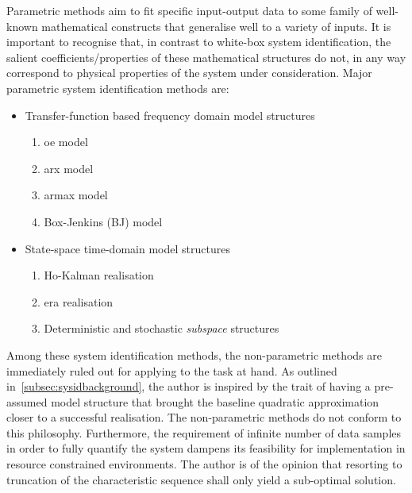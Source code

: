 Parametric  methods  aim  to  fit  specific input-output  data  to  some  family
of  well-known  mathematical  constructs  that  generalise  well  to  a  variety
of  inputs.  It  is  important  to recognise  that,  in  contrast  to  white-box
system identification, the salient coefficients/properties of these mathematical
structures do  not, in any way  correspond to physical properties  of the system
under consideration. Major parametric system identification methods are:
\begin{itemize}
    \item Transfer-function based frequency domain model structures
        \begin{enumerate}
            \item \gls{oe} model
            \item \gls{arx} model
            \item \gls{armax} model
            \item Box-Jenkins (BJ) model
        \end{enumerate}
    \item State-space time-domain model structures
        \begin{enumerate}
            \item Ho-Kalman realisation
            \item \gls{era} realisation
            \item Deterministic and stochastic \emph{subspace} structures
        \end{enumerate}
\end{itemize}

Among  these  system  identification  methods, the  non-parametric  methods  are
immediately  ruled  out   for  applying  to  the  task  at   hand.  As  outlined
in~\cref{subsec:sysidbackground},  the author  is  inspired by  the trait  of
having  a  pre-assumed  model  structure that  brought  the  baseline  quadratic
approximation closer to a successful  realisation. The non-parametric methods do
not conform to this philosophy.  Furthermore, the requirement of infinite number
of data  samples in order to  fully quantify the system  dampens its feasibility
for implementation  in resource constrained  environments. The author is  of the
opinion that resorting  to truncation of the characteristic  sequence shall only
yield a sub-optimal solution.

